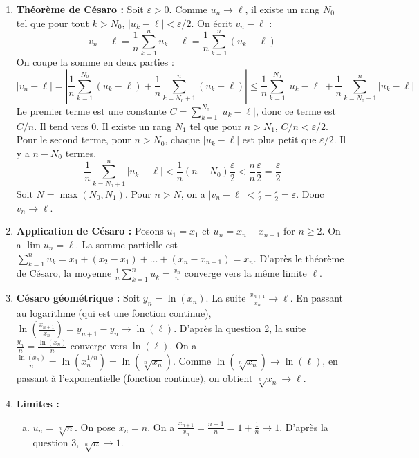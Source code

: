 \documentclass[]{exercices}
\begin{document}
\begin{solution}
	\begin{enumerate}
		\item \textbf{Théorème de Césaro :} Soit $\varepsilon > 0$. Comme $u_n \to \ell$, il existe un rang $N_0$ tel que pour tout $k > N_0$, $|u_k - \ell| < \varepsilon/2$. On écrit $v_n - \ell$ :
		      \[ v_n - \ell = \frac{1}{n}\sum_{k=1}^n u_k - \ell = \frac{1}{n}\sum_{k=1}^n (u_k - \ell) \]
		      On coupe la somme en deux parties :
		      \[ |v_n - \ell| = \left| \frac{1}{n}\sum_{k=1}^{N_0} (u_k - \ell) + \frac{1}{n}\sum_{k=N_0+1}^{n} (u_k - \ell) \right| \le \frac{1}{n}\sum_{k=1}^{N_0} |u_k - \ell| + \frac{1}{n}\sum_{k=N_0+1}^{n} |u_k - \ell| \]
		      Le premier terme est une constante $C = \sum_{k=1}^{N_0} |u_k - \ell|$, donc ce terme est $C/n$. Il tend vers 0. Il existe un rang $N_1$ tel que pour $n>N_1$, $C/n < \varepsilon/2$.
		      Pour le second terme, pour $n>N_0$, chaque $|u_k-\ell|$ est plus petit que $\varepsilon/2$. Il y a $n-N_0$ termes.
		      \[ \frac{1}{n}\sum_{k=N_0+1}^{n} |u_k - \ell| < \frac{1}{n}(n-N_0)\frac{\varepsilon}{2} < \frac{n}{n}\frac{\varepsilon}{2} = \frac{\varepsilon}{2} \]
		      Soit $N = \max(N_0, N_1)$. Pour $n > N$, on a $|v_n - \ell| < \frac{\varepsilon}{2} + \frac{\varepsilon}{2} = \varepsilon$. Donc $v_n \to \ell$.
		\item \textbf{Application de Césaro :} Posons $u_1 = x_1$ et $u_n = x_n - x_{n-1}$ for $n \ge 2$.
		      On a $\lim u_n = \ell$.
		      La somme partielle est $\sum_{k=1}^n u_k = x_1 + (x_2-x_1) + \dots + (x_n-x_{n-1}) = x_n$.
		      D'après le théorème de Césaro, la moyenne $\frac{1}{n}\sum_{k=1}^n u_k = \frac{x_n}{n}$ converge vers la même limite $\ell$.
		\item \textbf{Césaro géométrique :} Soit $y_n = \ln(x_n)$. La suite $\frac{x_{n+1}}{x_n} \to \ell$. En passant au logarithme (qui est une fonction continue), $\ln(\frac{x_{n+1}}{x_n}) = y_{n+1} - y_n \to \ln(\ell)$.
		      D'après la question 2, la suite $\frac{y_n}{n} = \frac{\ln(x_n)}{n}$ converge vers $\ln(\ell)$.
		      On a $\frac{\ln(x_n)}{n} = \ln(x_n^{1/n}) = \ln(\sqrt[n]{x_n})$.
		      Comme $\ln(\sqrt[n]{x_n}) \to \ln(\ell)$, en passant à l'exponentielle (fonction continue), on obtient $\sqrt[n]{x_n} \to \ell$.
		\item \textbf{Limites :}
		      \begin{enumerate}[a)]
			      \item $u_n = \sqrt[n]{n}$. On pose $x_n=n$. On a $\frac{x_{n+1}}{x_n} = \frac{n+1}{n} = 1+\frac{1}{n} \to 1$. D'après la question 3, $\sqrt[n]{n} \to 1$.

\end{enumerate}
\end{enumerate}
\end{solution}
\end{document}

